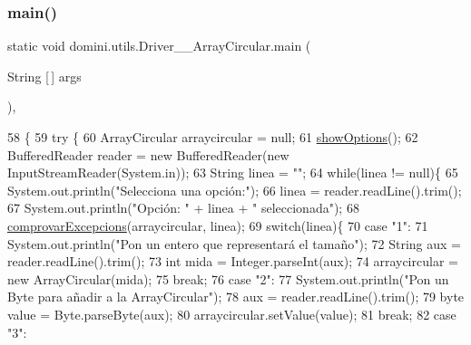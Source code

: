 \subsubsection{\texorpdfstring{main()}{main()}}
{\footnotesize\ttfamily static void domini.\+utils.\+Driver\+\_\+\+\_\+\+Array\+Circular.\+main (\begin{DoxyParamCaption}\item[{String \mbox{[}$\,$\mbox{]}}]{args }\end{DoxyParamCaption})\hspace{0.3cm}{\ttfamily [inline]}, {\ttfamily [static]}}


\begin{DoxyCode}
58                                            \{
59     \textcolor{keywordflow}{try} \{
60         ArrayCircular arraycircular = null;
61         \hyperlink{classdomini_1_1utils_1_1Driver____ArrayCircular_afac5a37f91b2914e692993e71c2d393c}{showOptions}();
62         BufferedReader reader = \textcolor{keyword}{new} BufferedReader(\textcolor{keyword}{new} InputStreamReader(System.in));
63         String linea = \textcolor{stringliteral}{""};
64         \textcolor{keywordflow}{while}(linea != null)\{
65             System.out.println(\textcolor{stringliteral}{"Selecciona una opción:"});
66             linea = reader.readLine().trim();
67             System.out.println(\textcolor{stringliteral}{"Opción: "} + linea + \textcolor{stringliteral}{" seleccionada"});
68             \hyperlink{classdomini_1_1utils_1_1Driver____ArrayCircular_a0f5f42c5ace9176cfcae4dfe9717f380}{comprovarExcepcions}(arraycircular, linea);
69             \textcolor{keywordflow}{switch}(linea)\{
70                 \textcolor{keywordflow}{case} \textcolor{stringliteral}{"1"}:
71                     System.out.println(\textcolor{stringliteral}{"Pon un entero que representará el tamaño"});
72                     String aux = reader.readLine().trim();
73                     \textcolor{keywordtype}{int} mida = Integer.parseInt(aux);
74                     arraycircular = \textcolor{keyword}{new} ArrayCircular(mida);
75                 \textcolor{keywordflow}{break};
76                 \textcolor{keywordflow}{case} \textcolor{stringliteral}{"2"}:
77                     System.out.println(\textcolor{stringliteral}{"Pon un Byte para añadir a la ArrayCircular"});
78                     aux = reader.readLine().trim();
79                     byte value = Byte.parseByte(aux);
80                     arraycircular.setValue(value);
81                 \textcolor{keywordflow}{break};
82                 \textcolor{keywordflow}{case} \textcolor{stringliteral}{"3"}:

\end{DoxyCode}
